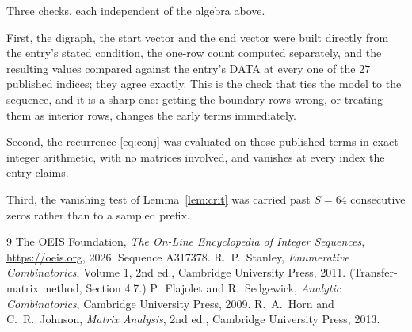 \documentclass[11pt,a4paper]{article}
\theoremstyle{plain}
\theoremstyle{definition}
\begin{document}
Three checks, each independent of the algebra above.

First, the digraph, the start vector and the end vector were built directly from the
entry's stated condition, the one-row count computed separately, and the resulting values
compared against the entry's DATA at every one of the $27$ published indices; they
agree exactly. This is the check that ties the model to the sequence, and it is a sharp one:
getting the boundary rows wrong, or treating them as interior rows, changes the early terms
immediately.

Second, the recurrence \eqref{eq:conj} was evaluated on those published terms in exact
integer arithmetic, with no matrices involved, and vanishes at every index the entry claims.

Third, the vanishing test of Lemma~\ref{lem:crit} was carried past $S=64$ consecutive
zeros rather than to a sampled prefix.

\begin{thebibliography}{9}
 The OEIS Foundation, \emph{The On-Line Encyclopedia of Integer
Sequences}, \url{https://oeis.org}, 2026. Sequence A317378.
 R.~P.~Stanley, \emph{Enumerative Combinatorics}, Volume 1, 2nd ed.,
Cambridge University Press, 2011. (Transfer-matrix method, Section 4.7.)
 P.~Flajolet and R.~Sedgewick, \emph{Analytic Combinatorics}, Cambridge
University Press, 2009.
 R.~A.~Horn and C.~R.~Johnson, \emph{Matrix Analysis}, 2nd ed., Cambridge
University Press, 2013.
\end{thebibliography}
\end{document}
